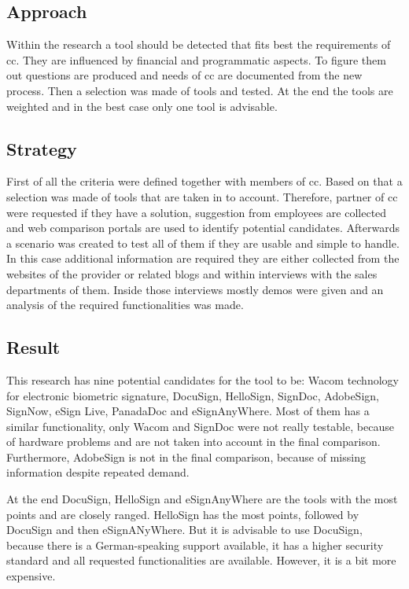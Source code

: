 \subsection{Approach}
Within the research a tool should be detected that fits best the requirements of \gls{cc}. They are influenced by financial and programmatic aspects. To figure them out questions are produced and needs of \gls{cc} are documented from the new process. Then a selection was made of tools and tested. At the end the tools are weighted and in the best case only one tool is advisable.   


\subsection{Strategy}
First of all the criteria were defined together with members of \gls{cc}. Based on that a selection was made of tools that are taken in to account. Therefore, partner of \gls{cc} were requested if they have a solution, suggestion from employees are collected and web comparison portals are used to identify potential candidates. Afterwards a scenario was created to test all of them if they are usable and simple to handle. In this case additional information are required they are either collected from the websites of the provider or related blogs and within interviews with the sales departments of them. Inside those interviews mostly demos were given and an analysis of the required functionalities was made.  

\subsection{Result}
This research has nine potential candidates for the tool to be: Wacom technology for electronic biometric signature, DocuSign, HelloSign, SignDoc, AdobeSign, SignNow, eSign Live, PanadaDoc and eSignAnyWhere. Most of them has a similar functionality, only Wacom and SignDoc were not really testable, because of hardware problems and are not taken into account in the final comparison. Furthermore, AdobeSign is not in the final comparison, because of missing information despite repeated demand.

At the end DocuSign, HelloSign and eSignAnyWhere are the tools with the most points and are closely ranged. HelloSign has the most points, followed by DocuSign and then eSignANyWhere. But it is advisable to use DocuSign, because there is a German-speaking support available, it has a higher security standard and all requested functionalities are available. However, it is a bit more expensive.  

